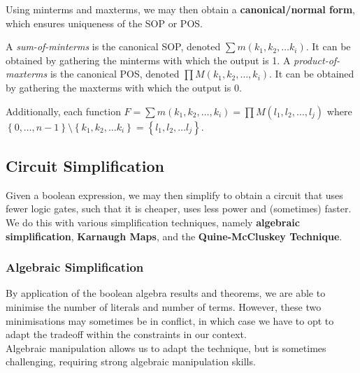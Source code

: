 Using minterms and maxterms, we may then obtain a \textbf{canonical/normal
form}, which ensures uniqueness of the SOP or POS\@.

A \textit{sum-of-minterms} is the canonical SOP, denoted $\sum m(k_1,k_2,\ldots
k_i)$. It can be obtained by gathering the minterms with which the output is 1.
A \textit{product-of-maxterms} is the canonical POS, denoted $\prod
M(k_1,k_2,\ldots,k_i)$. It can be obtained by gathering the maxterms with which
the output is 0.

Additionally, each function $F=\sum m(k_1,k_2,\ldots,k_i)=\prod M(l_1,l_2,\ldots,l_j)$
where $\left\{ 0,\ldots,n-1 \right\}\setminus\left\{ k_1,k_2,\ldots k_i
\right\}=\left\{ l_1,l_2,\ldots l_j \right\} $.


\subsection{Circuit Simplification}
Given a boolean expression, we may then simplify to obtain a circuit that uses
fewer logic gates, such that it is cheaper, uses less power and (sometimes)
faster. We do this with various simplification techniques, namely
\textbf{algebraic simplification}, \textbf{Karnaugh Maps}, and
the \textbf{Quine-McCluskey Technique}.

\subsubsection{Algebraic Simplification}
By application of the boolean algebra results and theorems, we are able to
minimise the number of literals and number of terms. However, these two
minimisations may sometimes be in conflict, in which case we have to opt to
adapt the tradeoff within the constraints in our context. \\

Algebraic manipulation allows us to adapt the technique, but is sometimes
challenging, requiring strong algebraic manipulation skills.

